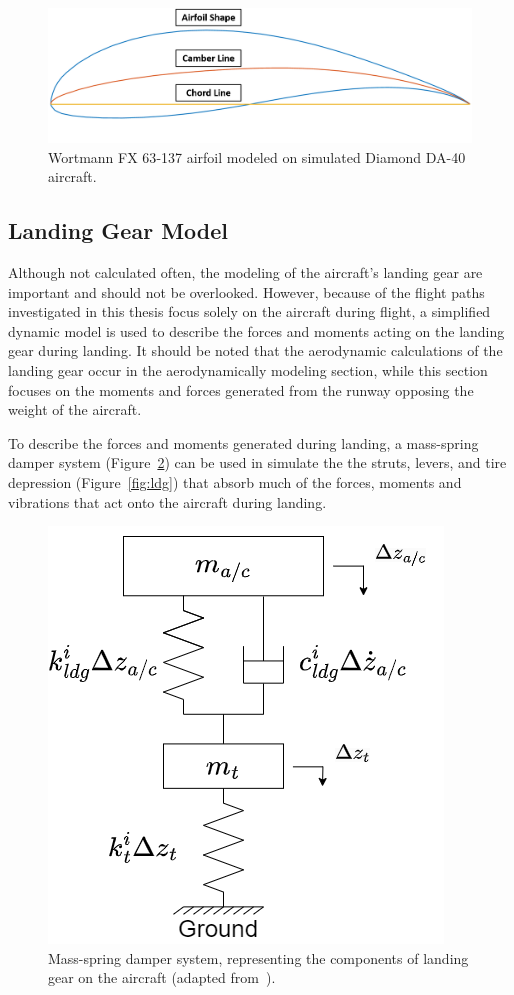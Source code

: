 \documentclass[12pt]{report}
\begin{document}
\begin{figure}[!ht]\label{fig:airfoil}
  \centering
  \includegraphics[width=\linewidth]{Figures/da40airfoil.png}
  \caption{Wortmann FX 63{-}137 airfoil modeled on simulated Diamond DA-40 aircraft.}
\end{figure}
\clearpage
\subsection{Landing Gear Model}
Although not calculated often, the modeling of the aircraft's landing gear are important and should not be overlooked. However, because of the flight paths investigated in this thesis focus solely on the aircraft during flight, a simplified dynamic model is used to describe the forces and moments acting on the landing gear during landing. It should be noted that the aerodynamic calculations of the landing gear occur in the aerodynamically modeling section, while this section focuses on the moments and forces generated from the runway opposing the weight of the aircraft.

To describe the forces and moments generated during landing, a mass-spring damper system (Figure~\ref{fig:ldgfbd}) can be used in simulate the the struts, levers, and tire depression (Figure~\ref{fig:ldg}) that absorb much of the forces, moments and vibrations that act onto the aircraft during landing.

\begin{figure}[!ht]\label{fig:ldgfbd}
  \centering
  \includegraphics[width=.4\linewidth]{Figures/ldgfbd.drawio.png}
  \caption{Mass-spring damper system, representing the components of landing gear on the aircraft (adapted from~\cite{xingStrengthAnalysisDiagonal2012}).}
\end{figure}
\end{document}
